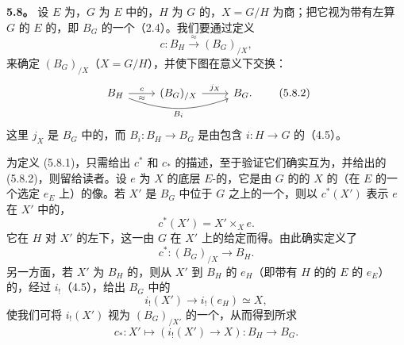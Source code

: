 \textbf{5.8。} 设 $E$ 为，$G$ 为 $E$ 中的，$H$ 为 $G$ 的，$X=G/H$ 为商；把它视为带有左算 $G$ 的 $E$ 的，即 $B_G$ 的一个（2.4）。我们要通过定义
\[c:B_H\xrightarrow{\approx}(B_G)_{/X},\tag{5.8.1}\]
来确定 $(B_G)_{/X}$（$X=G/H$），并使下图在意义下交换：
\[\begin{tikzcd}B_H\arrow[r,"c","\approx"']\arrow[rr,bend right=20,"B_i"']&(B_G)_{/X}\arrow[r,"j_X"]&B_G.\end{tikzcd}\tag{5.8.2}\]
这里 $j_X$ 是 $B_G$ 中的，而 $B_i:B_H\to B_G$ 是由包含 $i:H\to G$ 的（4.5）。

为定义 (5.8.1)，只需给出 $c^*$ 和 $c_*$ 的描述，至于验证它们确实互为，并给出的 (5.8.2)，则留给读者。设 $e$ 为 $X$ 的底层 $E$-的，它是由 $G$ 的的 $X$ 的（在 $E$ 的一个选定 $e_E$ 上）的像。若 $X'$ 是 $B_G$ 中位于 $G$ 之上的一个，则以 $c^*(X')$ 表示 $e$ 在 $X'$ 中的，
\[c^*(X')=X'\times_X e.\]
它在 $H$ 对 $X'$ 的左下，这一由 $G$ 在 $X'$ 上的给定而得。由此确实定义了
\[c^*:(B_G)_{/X}\longrightarrow B_H.\]
另一方面，若 $X'$ 为 $B_H$ 的，则从 $X'$ 到 $B_H$ 的 $e_H$（即带有 $H$ 的的 $E$ 的 $e_E$）的，经过 $i_!$（4.5），给出 $B_G$ 中的
\[i_!(X')\longrightarrow i_!(e_H)\simeq X,\]
使我们可将 $i_!(X')$ 视为 $(B_G)_{/X'}$ 的一个，从而得到所求
\[c_*:X'\longmapsto(i_!(X')\to X):B_H\longrightarrow B_G.\]

